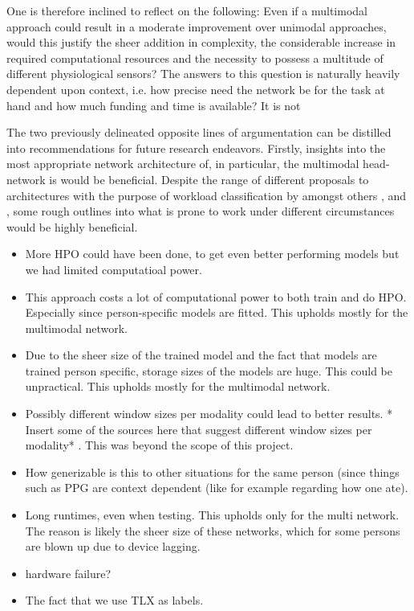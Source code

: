 \documentclass[12pt]{article}
\begin{document}
One is therefore inclined to reflect on the following: Even if a multimodal approach could result in a moderate improvement over unimodal approaches, would this justify the sheer addition in complexity,  the considerable increase in required computational resources and the necessity to possess a multitude of different physiological sensors? The answers to this question is naturally heavily dependent upon context, i.e. how precise need the network be for the task at hand and how much funding and time is available? It is not 

The two previously delineated opposite lines of argumentation can be distilled into recommendations for future research endeavors. Firstly, insights into the most appropriate network architecture of, in particular, the multimodal head-network is would be beneficial. Despite the range of different proposals to architectures with the purpose of workload classification by amongst others ,   and , some rough outlines into what is prone to work under different circumstances would be highly beneficial. 


\begin{itemize}
  \item  More HPO could have been done, to get even better performing models but we had limited computatioal power.   
  \item This approach costs a lot of computational power to both train and do HPO. Especially since person-specific models are fitted. This upholds mostly for the multimodal network.
  \item Due to the sheer size of the trained model and the fact that models are trained person specific, storage sizes of the models are huge. This could be unpractical.  This upholds mostly for the multimodal network.
  \item Possibly different window sizes per modality could lead to better results.  * Insert some of the sources here that suggest different window sizes per modality* . This was beyond the scope of this project.
   \item How generizable is this to other situations for the same person (since things such as PPG are context dependent (like for example regarding how one ate).
   \item Long runtimes,  even when testing. This upholds only for the multi network. The reason is likely the sheer size of these networks, which for some persons are blown up due to device lagging. 
   \item hardware failure?
   \item The fact that we use TLX as labels.
\end{itemize}





\newpage


\end{document}
